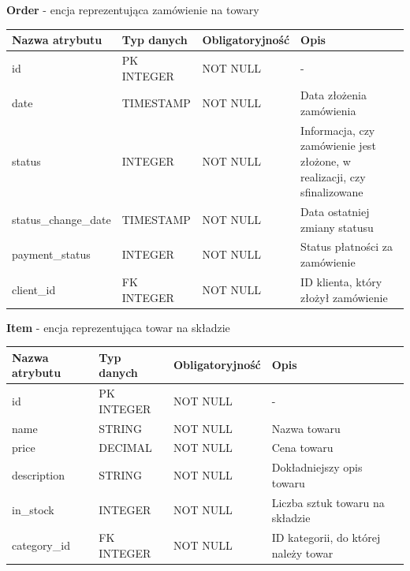 \documentclass[10pt,a4paper]{article}
\begin{document}
	  \flushleft \textbf{Order} - encja reprezentująca zamówienie na towary
      \begin{center}
        \begin{tabular}{| m{3cm} | m{3cm} | m{3cm} | m{3cm} |}
          \hline
          Nazwa atrybutu 	   & Typ danych & Obligatoryjność & Opis\\ \hline
		  id 		  	 	   & PK INTEGER & NOT NULL 		  & -\\ \hline
		  date 			 	   & TIMESTAMP  & NOT NULL 		  & Data złożenia zamówienia\\ \hline
		  status 		 	   & INTEGER 	& NOT NULL 		  & Informacja, czy zamówienie jest złożone, 
		  												        w realizacji, czy sfinalizowane\\ \hline
		  status\_change\_date & TIMESTAMP 	& NOT NULL 		  & Data ostatniej zmiany statusu\\ \hline
		  payment\_status 	   & INTEGER 	& NOT NULL 		  & Status płatności za zamówienie\\ \hline
		  client\_id 		   & FK INTEGER & NOT NULL 		  & ID klienta, który złożył zamówienie\\ \hline
		\end{tabular}
	  \end{center}

	  \newpage
	  \flushleft \textbf{Item} - encja reprezentująca towar na składzie
      \begin{center}
        \begin{tabular}{| m{3cm} | m{3cm} | m{3cm} |  m{3cm} |}
          \hline
          Nazwa atrybutu & Typ danych & Obligatoryjność & Opis\\ \hline
		  id 			 & PK INTEGER & NOT NULL 		& -\\ \hline
		  name 			 & STRING 	  & NOT NULL 		& Nazwa towaru\\ \hline
		  price 		 & DECIMAL 	  & NOT NULL 		& Cena towaru\\ \hline
		  description 	 & STRING 	  & NOT NULL 		& Dokładniejszy opis towaru\\ \hline
		  in\_stock 	 & INTEGER 	  & NOT NULL 		& Liczba sztuk towaru na składzie\\ \hline
		  category\_id 	 & FK INTEGER & NOT NULL 		& ID kategorii, do której należy towar\\ \hline
		\end{tabular}
	  \end{center}
\end{document}
